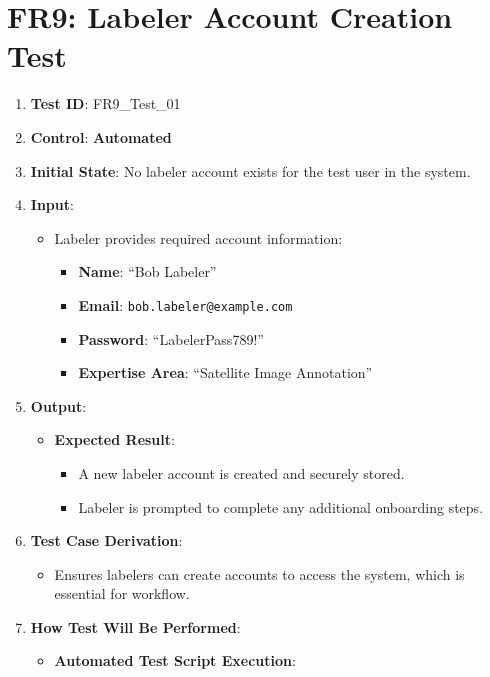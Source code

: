 \documentclass[12pt, titlepage]{article}
\begin{document}
\section*{FR9: Labeler Account Creation Test}

\begin{enumerate}
    \item \textbf{Test ID}: FR9\_Test\_01
    \item \textbf{Control}: \textbf{Automated}
    \item \textbf{Initial State}: No labeler account exists for the test user in the system.
    \item \textbf{Input}:
    \begin{itemize}
        \item Labeler provides required account information:
        \begin{itemize}
            \item \textbf{Name}: ``Bob Labeler''
            \item \textbf{Email}: \texttt{bob.labeler@example.com}
            \item \textbf{Password}: ``LabelerPass789!''
            \item \textbf{Expertise Area}: ``Satellite Image Annotation''
        \end{itemize}
    \end{itemize}
    \item \textbf{Output}:
    \begin{itemize}
        \item \textbf{Expected Result}:
        \begin{itemize}
            \item A new labeler account is created and securely stored.
            \item Labeler is prompted to complete any additional onboarding steps.
        \end{itemize}
    \end{itemize}
    \item \textbf{Test Case Derivation}:
    \begin{itemize}
        \item Ensures labelers can create accounts to access the system, which is essential for workflow.
    \end{itemize}
    \item \textbf{How Test Will Be Performed}:
    \begin{itemize}
        \item \textbf{Automated Test Script Execution}:

\end{itemize}
\end{enumerate}
\end{document}
